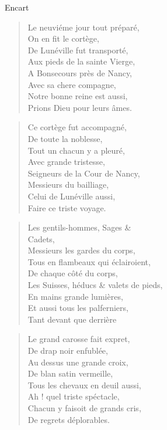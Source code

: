 \begin{diary}{Encart}{}
        \begin{verse}Le neuviéme jour tout préparé,\\On en fit le cortège,\\De Lunéville fut
                                 transporté,\\Aux pieds de la sainte Vierge,\\A Bonsecours près de
                                    Nancy,\\Avec sa chere compagne,\\Notre bonne reine est
                                 aussi,\\Prions Dieu pour leurs âmes.\\\end{verse}
        \bigskip

        \begin{verse}Ce cortège fut accompagné,\\De toute la noblesse,\\Tout un chacun y a pleuré,\\Avec grande tristesse,\\Seigneurs de la Cour de Nancy,\\Messieurs du bailliage,\\Celui de Lunéville
                                 aussi,\\Faire ce triste voyage.\\\end{verse}
        \bigskip

        \begin{verse}Les gentils-hommes, Sages \& \\Cadets,\\Messieurs les gardes du corps,\\Tous en flambeaux qui éclairoient,\\De chaque côté du corps,\\Les Suisses, héducs \& valets de
                                 pieds,\\En mains grande lumières,\\Et aussi tous les palferniers,\\Tant devant que derrière\\\end{verse}
        \bigskip

        \begin{verse}Le grand carosse fait expret,\\De drap noir enfublée,\\Au dessus une grande croix,\\De blan satin vermeille,\\Tous les chevaux en deuil aussi,\\Ah ! quel triste spéctacle,\\Chacun y faisoit de grands cris,\\De regrets déplorables.\\\end{verse}
        \bigskip


\end{diary}
